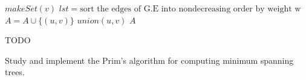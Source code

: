 \begin{frame}
  \begin{small}
  \begin{algorithmic}
      \State $makeSet(v)$
    \EndFor
    \State $lst = \text{sort the edges of G.E into nondecreasing order by weight w}$
       \State $A = A \cup \{(u, v)\}$
       \State $union(u, v)$
      \EndIf 
    \EndFor
     $A$  
    \EndProcedure
  \end{algorithmic}
  \end{small}
\end{frame}

\begin{frame}{TODO}

  Study and implement the Prim's algorithm for
  computing minimum spanning trees. 
 
\end{frame}
